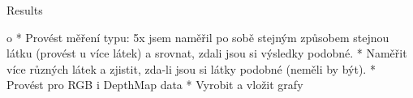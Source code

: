 \chap Results

		\Green
		\begitems \style o
			* Provést měření typu: 5x jsem naměřil po sobě stejným způsobem stejnou látku (provést u více látek) a srovnat, zdali jsou si výsledky podobné.
			* Naměřit více různých látek a zjistit, zda-li jsou si látky podobné (neměli by být).
			* Provést pro RGB i DepthMap data
			* Vyrobit a vložit grafy
		\enditems
		\Black
